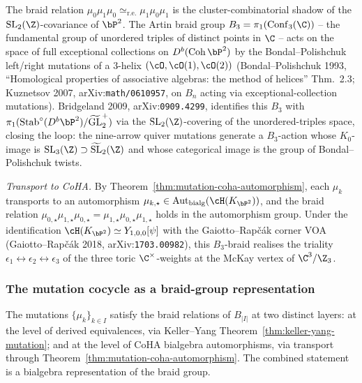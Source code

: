\begin{example}
The braid relation $\mu_0 \mu_1 \mu_0 \simeq_{\mathrm{r.e.}} \mu_1 \mu_0
\mu_1$ is the cluster-combinatorial shadow of the $\mathrm{SL}_2(\Z)$-covariance
of $\bP^2$. The Artin braid group $B_3 = \pi_1(\mathrm{Conf}_3(\C))$
-- the fundamental group of unordered triples of distinct points in $\C$
-- acts on the space of full exceptional collections on $D^b(\mathrm{Coh}\,
\bP^2)$ by the Bondal--Polishchuk left/right mutations of a $3$-helix
$(\cO, \cO(1), \cO(2))$ (Bondal--Polishchuk 1993, ``Homological properties
of associative algebras: the method of helices'' Thm.~2.3; Kuznetsov 2007,
arXiv:\texttt{math/0610957}, on $B_n$ acting via exceptional-collection
mutations). Bridgeland 2009, arXiv:\texttt{0909.4299}, identifies this
$B_3$ with $\pi_1(\mathrm{Stab}^{\circ}(D^b \bP^2) / \widetilde{\mathrm{GL}}_2^{+})$
via the $\mathrm{SL}_2(\Z)$-covering of the unordered-triples space, closing
the loop: the nine-arrow quiver mutations generate a $B_3$-action
whose $K_0$-image is $\mathrm{SL}_3(\Z) \supset \widetilde{\mathrm{SL}}_2(\Z)$
and whose categorical image is the group of Bondal--Polishchuk twists.

\emph{Transport to CoHA.} By
Theorem~\ref{thm:mutation-coha-automorphism}, each $\mu_k$ transports to an
automorphism $\mu_{k, \star} \in \mathrm{Aut}_{\mathrm{bialg}}(\cH(K_{\bP^2}))$,
and the braid relation $\mu_{0,\star} \mu_{1,\star} \mu_{0,\star} =
\mu_{1,\star} \mu_{0,\star} \mu_{1,\star}$ holds in the automorphism group.
Under the identification $\cH(K_{\bP^2}) \simeq Y_{1, 0, 0}[\psi]$ with the
Gaiotto--Rap\v{c}\'ak corner VOA (Gaiotto--Rap\v{c}\'ak 2018,
arXiv:\texttt{1703.00982}), this $B_3$-braid realises the triality
$\epsilon_1 \leftrightarrow \epsilon_2 \leftrightarrow \epsilon_3$ of the
three toric $\C^\times$-weights at the McKay vertex of $\C^3/\Z_3$.
\end{example}

\subsubsection{The mutation cocycle as a braid-group representation}

The mutations $\{\mu_k\}_{k \in I}$ satisfy the braid relations of $B_{|I|}$
at two distinct layers: at the level of derived equivalences, via Keller--Yang
Theorem~\ref{thm:keller-yang-mutation}; and at the level of CoHA bialgebra
automorphisms, via transport through
Theorem~\ref{thm:mutation-coha-automorphism}. The combined statement is a
bialgebra representation of the braid group.

